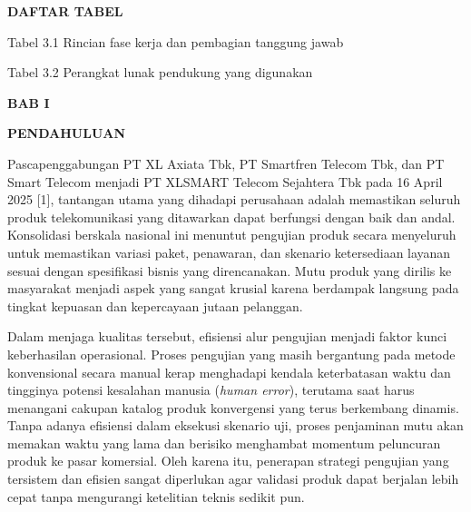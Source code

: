 \documentclass[12pt,a4paper]{article}
\begin{document}
\clearpage
\begin{center}
    {\bfseries\large DAFTAR TABEL\par}
\end{center}
\vspace{0.6cm}

\begin{singlespace}
\noindent Tabel 3.1 Rincian fase kerja dan pembagian tanggung jawab \par
\noindent Tabel 3.2 Perangkat lunak pendukung yang digunakan \par
\end{singlespace}

\clearpage
{}
\setcounter{page}{1}

\begin{center}
    {\bfseries\large BAB I\par}
    {\bfseries\large PENDAHULUAN\par}
\end{center}
\vspace{0.4cm}

Pascapenggabungan PT XL Axiata Tbk, PT Smartfren Telecom Tbk, dan PT Smart Telecom menjadi PT XLSMART Telecom Sejahtera Tbk pada 16 April 2025 [1], tantangan utama yang dihadapi perusahaan adalah memastikan seluruh produk telekomunikasi yang ditawarkan dapat berfungsi dengan baik dan andal. Konsolidasi berskala nasional ini menuntut pengujian produk secara menyeluruh untuk memastikan variasi paket, penawaran, dan skenario ketersediaan layanan sesuai dengan spesifikasi bisnis yang direncanakan. Mutu produk yang dirilis ke masyarakat menjadi aspek yang sangat krusial karena berdampak langsung pada tingkat kepuasan dan kepercayaan jutaan pelanggan.

Dalam menjaga kualitas tersebut, efisiensi alur pengujian menjadi faktor kunci keberhasilan operasional. Proses pengujian yang masih bergantung pada metode konvensional secara manual kerap menghadapi kendala keterbatasan waktu dan tingginya potensi kesalahan manusia (\textit{human error}), terutama saat harus menangani cakupan katalog produk konvergensi yang terus berkembang dinamis. Tanpa adanya efisiensi dalam eksekusi skenario uji, proses penjaminan mutu akan memakan waktu yang lama dan berisiko menghambat momentum peluncuran produk ke pasar komersial. Oleh karena itu, penerapan strategi pengujian yang tersistem dan efisien sangat diperlukan agar validasi produk dapat berjalan lebih cepat tanpa mengurangi ketelitian teknis sedikit pun.
\end{document}
